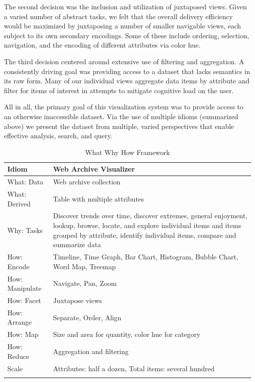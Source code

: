 \documentclass[10pt,journal,compsoc]{IEEEtran}
\begin{document}
The second decision was the inclusion and utilization of juxtaposed views.
Given a varied number of abstract tasks, we felt that the overall delivery efficiency would
be maximized by juxtaposing a number of smaller navigable views, each subject to its
own secondary encodings. Some of these include ordering, selection, navigation, and
the encoding of different attributes via color hue.

The third decision centered around extensive use of filtering and aggregation. A consistently driving goal 
was providing access to a dataset that lacks semantics in its raw form. Many of our
individual views aggregate data items by attribute and filter for items of interest 
in attempts to mitigate cognitive load on the user. 

All in all, the primary goal of this visualization system was to provide access to an otherwise inaccessible dataset.
Via the use of multiple idioms (summarized above) we present the dataset
from multiple, varied perspectives that enable effective analysis, search, and query.

\begin{table}
\renewcommand{\arraystretch}{1.3}
\caption{What Why How Framework}
\label{tab:example}
\centering
\begin{tabular}{l|l}
    \hline
    Idiom  &  Web Archive Visualizer\\
    \hline
    \hline
	What: Data & Web archive collection \\ \hline
	What: Derived & Table with multiple attributes \\   \hline
	Why: Tasks & \parbox[t]{5cm}{Discover trends over time, discover extremes, general enjoyment, lookup, browse, locate, and explore individual items and items grouped by attribute, identify individual items, compare and summarize data} \\ \hline
	How: Encode & \parbox[t]{5cm}{Timeline,  Time Graph, Bar Chart, Histogram, Bubble Chart, Word Map, Treemap} \\ \hline
	How: Manipulate & Navigate, Pan, Zoom \\  \hline
	How: Facet & Juxtapose views \\  \hline
	How: Arrange & Separate, Order, Align \\ \hline
	How: Map & Size and area for quantity, color hue for category \\ \hline
	How: Reduce & Aggregation and filtering \\  \hline
Scale & \parbox[t]{5cm}{Attributes: half a dozen, Total items: several hundred} \\
	\\
    \hline
\end{tabular}
\end{table}
\end{document}
